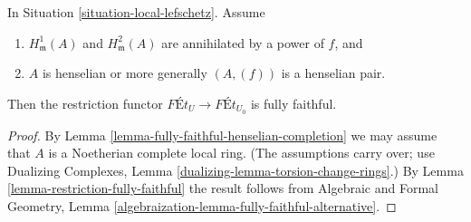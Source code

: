 \begin{lemma}
\label{lemma-fully-faithful-minimal}
\begin{reference}
\cite[Corollary 1.11]{Bhatt-local}
\end{reference}
In Situation \ref{situation-local-lefschetz}. Assume
\begin{enumerate}
\item $H^1_\mathfrak m(A)$ and $H^2_\mathfrak m(A)$ are
annihilated by a power of $f$, and
\item $A$ is henselian or more generally $(A, (f))$ is a henselian pair.
\end{enumerate}
Then the restriction functor
$\textit{F\'Et}_U \longrightarrow \textit{F\'Et}_{U_0}$
is fully faithful.
\end{lemma}

\begin{proof}
By Lemma \ref{lemma-fully-faithful-henselian-completion}
we may assume that $A$ is a Noetherian complete local ring.
(The assumptions carry over; use
Dualizing Complexes, Lemma \ref{dualizing-lemma-torsion-change-rings}.)
By Lemma \ref{lemma-restriction-fully-faithful}
the result follows from
Algebraic and Formal Geometry, Lemma
\ref{algebraization-lemma-fully-faithful-alternative}.
\end{proof}
